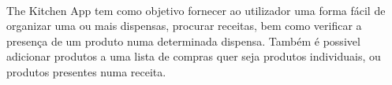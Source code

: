 \paragraph{}
The Kitchen App tem como objetivo fornecer ao utilizador uma forma fácil de organizar uma ou mais dispensas, procurar receitas, bem como verificar a presença de um produto numa determinada dispensa. Também é possivel adicionar produtos a uma lista de compras quer seja produtos individuais, ou produtos presentes numa receita.
\par

